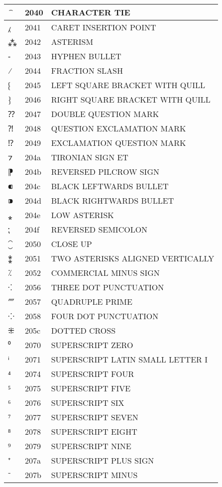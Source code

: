 \documentclass[12pt,letterpaper,openany]{book}
\begin{document}
\begin{center}
\begin{supertabular}{|m{0.25in}|m{0.5in}|m{4in}|}
⁀ & 2040 & CHARACTER TIE\\\hline
⁁ & 2041 & CARET INSERTION POINT\\\hline
⁂ & 2042 & ASTERISM\\\hline
⁃ & 2043 & HYPHEN BULLET\\\hline
⁄ & 2044 & FRACTION SLASH\\\hline
⁅ & 2045 & LEFT SQUARE BRACKET WITH QUILL\\\hline
⁆ & 2046 & RIGHT SQUARE BRACKET WITH QUILL\\\hline
⁇ & 2047 & DOUBLE QUESTION MARK\\\hline
⁈ & 2048 & QUESTION EXCLAMATION MARK\\\hline
⁉ & 2049 & EXCLAMATION QUESTION MARK\\\hline
⁊ & 204a & TIRONIAN SIGN ET\\\hline
⁋ & 204b & REVERSED PILCROW SIGN\\\hline
⁌ & 204c & BLACK LEFTWARDS BULLET\\\hline
⁍ & 204d & BLACK RIGHTWARDS BULLET\\\hline
⁎ & 204e & LOW ASTERISK\\\hline
⁏ & 204f & REVERSED SEMICOLON\\\hline
⁐ & 2050 & CLOSE UP\\\hline
⁑ & 2051 & TWO ASTERISKS ALIGNED VERTICALLY\\\hline
⁒ & 2052 & COMMERCIAL MINUS SIGN\\\hline
⁖ & 2056 & THREE DOT PUNCTUATION\\\hline
⁗ & 2057 & QUADRUPLE PRIME\\\hline
⁘ & 2058 & FOUR DOT PUNCTUATION\\\hline
⁜ & 205c & DOTTED CROSS\\\hline
⁰ & 2070 & SUPERSCRIPT ZERO\\\hline
ⁱ & 2071 & SUPERSCRIPT LATIN SMALL LETTER I\\\hline
⁴ & 2074 & SUPERSCRIPT FOUR\\\hline
⁵ & 2075 & SUPERSCRIPT FIVE\\\hline
⁶ & 2076 & SUPERSCRIPT SIX\\\hline
⁷ & 2077 & SUPERSCRIPT SEVEN\\\hline
⁸ & 2078 & SUPERSCRIPT EIGHT\\\hline
⁹ & 2079 & SUPERSCRIPT NINE\\\hline
⁺ & 207a & SUPERSCRIPT PLUS SIGN\\\hline
⁻ & 207b & SUPERSCRIPT MINUS\\\hline

\end{supertabular}
\end{center}
\end{document}
